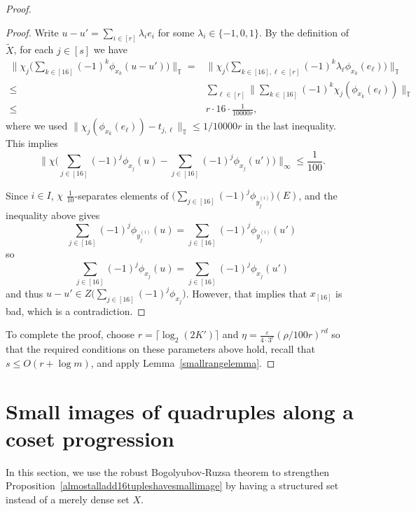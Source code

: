 \documentclass[a4paper,11pt]{article}
\numberwithin{theorem}{section}
\theoremstyle{definition}
\begin{document}
\begin{proof}
\begin{proof}
        Write $u - u' = \sum_{i \in [r]} \lambda_i e_i$ for some $\lambda_i \in \{-1,0,1\}$. By the definition of $\tilde{X}$, for each $j \in [s]$ we have 
        \begin{align*}\Big\|\chi_j\Big(\sum_{k \in [16]} (-1)^k \phi_{x_k}(u - u')\Big)\Big\|_{\mathbb{T}} = &\Big\|\chi_j\Big(\sum_{k \in [16], \ell\in [r]} (-1)^k \lambda_\ell\phi_{x_k}(e_\ell)\Big) \Big\|_{\mathbb{T}}\\
        \leq &\sum_{\ell \in [r]} \Big\| \sum_{k \in [16]} (-1)^k \chi_j(\phi_{x_k}(e_\ell)) \Big\|_{\mathbb{T}}\\
        \leq & r \cdot 16 \cdot \frac{1}{10000r},\end{align*}
        where we used $\|\chi_j(\phi_{x_k}(e_\ell)) - t_{j, \ell}\|_{\mathbb{T}} \leq 1/10000r$ in the last inequality.\\
        \indent This implies 
        \[\Big\|\chi\Big(\sum_{j \in [16]} (-1)^j \phi_{x_j}(u) - \sum_{j \in [16]} (-1)^j \phi_{x_j}(u')\Big)\Big\|_\infty \leq \frac{1}{100}.\]
        
        Since $i \in I$, $\chi$ $\frac{1}{10}$-separates elements of $\Big(\sum_{j \in [16]} (-1)^j\phi_{y^{(i)}_j}\Big)(E)$, and the inequality above gives 
        \[\sum_{j \in [16]} (-1)^j \phi_{y^{(i)}_j}(u) = \sum_{j \in [16]} (-1)^j \phi_{y^{(i)}_j}(u')\]
        so
        \[\sum_{j \in [16]} (-1)^j \phi_{x_j}(u) = \sum_{j \in [16]} (-1)^j \phi_{x_j}(u')\]
        and thus $u - u' \in Z\Big(\sum_{j \in [16]} (-1)^j \phi_{x_j}\Big)$. However, that implies that $x_{[16]}$ is bad, which is a contradiction.  
    \end{proof}

    To complete the proof, choose $r = \lceil \log_2(2K') \rceil$ and $\eta = \frac{\varepsilon}{4\cdot 3^r} (\rho/100r)^{r d}$ so that the required conditions on these parameters above hold, recall that $s \leq O(r + \log m)$, and apply Lemma~\ref{smallrangelemma}.
\end{proof}

\section{Small images of quadruples along a coset progression}\label{firstBRstepSection}

In this section, we use the robust Bogolyubov-Ruzsa theorem to strengthen Proposition~\ref{almostalladd16tupleshavesmallimage} by having a structured set instead of a merely dense set $X$. 
\end{document}
